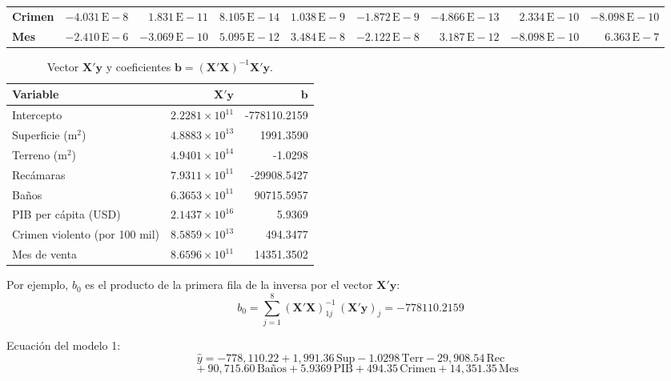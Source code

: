 \documentclass[12pt,letterpaper]{article}
\newcommand{\paren}[1]{\left(#1\right)}
\begin{document}
\begin{table}[H]
\begin{tabular}{l*{8}{r}}
\textbf{Crimen} & $-4.031{\scriptstyle\,\mathrm{E}-8}$ & $1.831{\scriptstyle\,\mathrm{E}-11}$ & $8.105{\scriptstyle\,\mathrm{E}-14}$ & $1.038{\scriptstyle\,\mathrm{E}-9}$ & $-1.872{\scriptstyle\,\mathrm{E}-9}$ & $-4.866{\scriptstyle\,\mathrm{E}-13}$ & $2.334{\scriptstyle\,\mathrm{E}-10}$ & $-8.098{\scriptstyle\,\mathrm{E}-10}$ \\
\textbf{Mes} & $-2.410{\scriptstyle\,\mathrm{E}-6}$ & $-3.069{\scriptstyle\,\mathrm{E}-10}$ & $5.095{\scriptstyle\,\mathrm{E}-12}$ & $3.484{\scriptstyle\,\mathrm{E}-8}$ & $-2.122{\scriptstyle\,\mathrm{E}-8}$ & $3.187{\scriptstyle\,\mathrm{E}-12}$ & $-8.098{\scriptstyle\,\mathrm{E}-10}$ & $6.363{\scriptstyle\,\mathrm{E}-7}$ \\
\bottomrule
\end{tabular}
\end{table}

\begin{table}[H]
\centering
\caption{Vector $\mathbf{X}'\mathbf{y}$ y coeficientes $\mathbf{b} = \paren{\mathbf{X}'\mathbf{X}}^{-1}\mathbf{X}'\mathbf{y}$.}
\small
\begin{tabular}{lrr}
\toprule
Variable & $\mathbf{X}'\mathbf{y}$ & $\mathbf{b}$ \\
\midrule
Intercepto & $2.2281\times10^{11}$ & -778110.2159 \\
Superficie (m$^2$) & $4.8883\times10^{13}$ & 1991.3590 \\
Terreno (m$^2$) & $4.9401\times10^{14}$ & -1.0298 \\
Recámaras & $7.9311\times10^{11}$ & -29908.5427 \\
Baños & $6.3653\times10^{11}$ & 90715.5957 \\
PIB per cápita (USD) & $2.1437\times10^{16}$ & 5.9369 \\
Crimen violento (por 100 mil) & $8.5859\times10^{13}$ & 494.3477 \\
Mes de venta & $8.6596\times10^{11}$ & 14351.3502 \\
\bottomrule
\end{tabular}
\end{table}

Por ejemplo, $b_0$ es el producto de la primera fila de la inversa por el vector $\mathbf{X}'\mathbf{y}$:
$$ b_0 = \sum_{j=1}^{8} \paren{\mathbf{X}'\mathbf{X}}^{-1}_{1j}\,\paren{\mathbf{X}'\mathbf{y}}_j = -778110.2159 $$

Ecuación del modelo 1:
$$ \hat{y} = -778,110.22 + 1,991.36\,\text{Sup} - 1.0298\,\text{Terr} - 29,908.54\,\text{Rec} $$
$$ \quad + 90,715.60\,\text{Baños} + 5.9369\,\text{PIB} + 494.35\,\text{Crimen} + 14,351.35\,\text{Mes} $$
\end{document}
